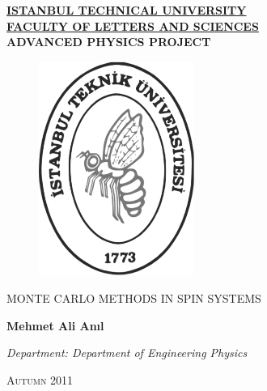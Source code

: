   \begin{titlepage}
    \begin{center}
  \doublespacing
  \underline{\textbf{ISTANBUL TECHNICAL UNIVERSITY}} \\ \underline{\textbf{FACULTY OF LETTERS AND SCIENCES}} \\ \textbf{ADVANCED PHYSICS PROJECT}
  \vspace{1.5cm}
  
  \begin{figure}[H]
  \center
  \includegraphics[height = 7cm]{fig/ITUgr.eps}
  \end{figure}
  
  \vspace{2.5cm}
   MONTE CARLO METHODS IN SPIN SYSTEMS
   
   \vspace{2cm}
  \textbf{Mehmet Ali Anıl}
  
  
  \vfill
  \emph{Department: Department of Engineering Physics}
  
  \vspace{2cm}
  \textsc{Autumn} 2011
   
  
    \end{center}
  \end{titlepage}
  \newpage
  
   \setcounter{page}{1}
    
